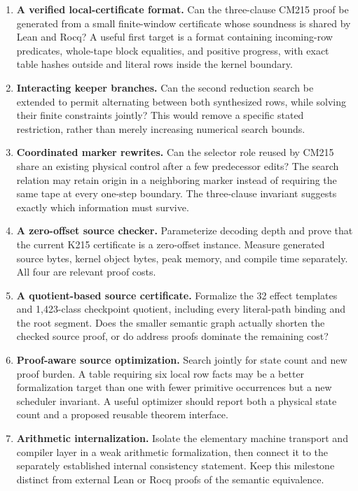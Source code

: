 \documentclass[11pt,letterpaper]{article}
\theoremstyle{definition}
\begin{document}
\begin{enumerate}
\item \textbf{A verified local-certificate format.} Can the three-clause
CM215 proof be generated from a small finite-window certificate whose
soundness is shared by Lean and Rocq? A useful first target is a format
containing incoming-row predicates, whole-tape block equalities, and
positive progress, with exact table hashes outside and literal rows
inside the kernel boundary.

\item \textbf{Interacting keeper branches.} Can the second reduction
search be extended to permit alternating between both synthesized rows,
while solving their finite constraints jointly? This would remove a
specific stated restriction, rather than merely increasing numerical
search bounds.

\item \textbf{Coordinated marker rewrites.} Can the selector role reused
by CM215 share an existing physical control after a few predecessor
edits? The search relation may retain origin in a neighboring marker
instead of requiring the same tape at every one-step boundary. The
three-clause invariant suggests exactly which information must survive.

\item \textbf{A zero-offset source checker.} Parameterize decoding depth
and prove that the current K215 certificate is a zero-offset instance.
Measure generated source bytes, kernel object bytes, peak memory, and
compile time separately. All four are relevant proof costs.

\item \textbf{A quotient-based source certificate.} Formalize the 32
effect templates and 1,423-class checkpoint quotient, including every
literal-path binding and the root segment. Does the smaller semantic
graph actually shorten the checked source proof, or do address proofs
dominate the remaining cost?

\item \textbf{Proof-aware source optimization.} Search jointly for
state count and new proof burden. A table requiring six local row facts
may be a better formalization target than one with fewer primitive
occurrences but a new scheduler invariant. A useful optimizer should
report both a physical state count and a proposed reusable theorem
interface.

\item \textbf{Arithmetic internalization.} Isolate the elementary
machine transport and compiler layer in a weak arithmetic formalization,
then connect it to the separately established internal consistency
statement. Keep this milestone distinct from external Lean or Rocq
proofs of the semantic equivalence.
\end{enumerate}
\end{document}
